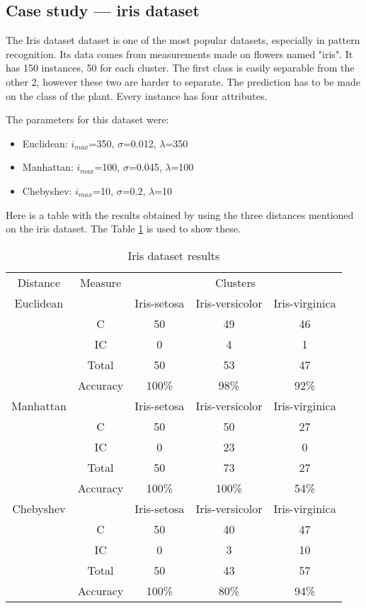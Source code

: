 \documentclass[conference]{IEEEtran}
\begin{document}
\subsection{Case study --- iris dataset}

The Iris dataset \cite{website:iris} dataset is one of the most popular datasets, especially in pattern recognition. Its data comes from measurements made on flowers named "iris". It has 150 instances, 50 for each cluster. The first class is easily separable from the other 2, however these two are harder to separate. The prediction has to be made on the class of the plant. Every instance has four attributes.

The parameters for this dataset were:
\begin{itemize}
\item Euclidean: $i_{max}$=350, $\sigma$=0.012, $\lambda$=350
\item Manhattan: $i_{max}$=100, $\sigma$=0.045, $\lambda$=100
\item Chebyshev: $i_{max}$=10, $\sigma$=0.2, $\lambda$=10
\end{itemize}

Here is a table with the results obtained by using the three distances mentioned on the iris \cite{website:iris} dataset. The Table \ref{table_iris} is used to show these.

\begin{table}[!t]
\renewcommand{\arraystretch}{1.3}
\caption{Iris dataset results}
\label{table_iris}
\centering
\begin{tabular}{|c|c|c|c|c|}
\cline{1-5}
 Distance & Measure & \multicolumn{3}{|c|}{Clusters} \\
\cline{1-5}
Euclidean & & Iris-setosa & Iris-versicolor & Iris-virginica \\
& C & 50 & 49 & 46 \\
& IC & 0 & 4 & 1 \\
& Total & 50 & 53 & 47 \\
& Accuracy & 100\% & 98\% & 92\% \\
\hline
Manhattan & & Iris-setosa & Iris-versicolor & Iris-virginica \\
& C & 50 & 50 & 27 \\
& IC & 0 & 23 & 0 \\
& Total & 50 & 73 & 27 \\
& Accuracy & 100\% & 100\% & 54\% \\
\hline
Chebyshev & & Iris-setosa & Iris-versicolor & Iris-virginica \\
& C & 50 & 40 & 47 \\
& IC & 0 & 3 & 10 \\
& Total & 50 & 43 & 57 \\
& Accuracy & 100\% & 80\% & 94\% \\
\hline
\end{tabular}
\end{table}
\end{document}
